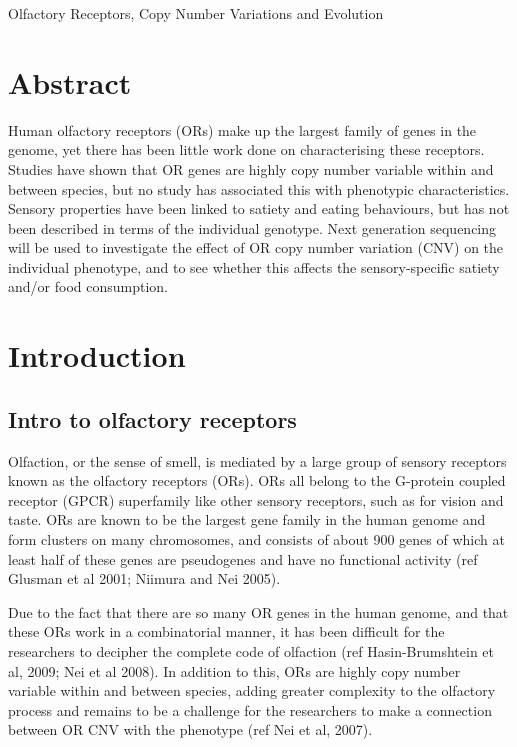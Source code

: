 \documentclass[a4paper, 12pt]{article}
\begin{document}
\begin{center}
\large{Olfactory Receptors, Copy Number Variations and Evolution}
\end{center}

\section*{\normalsize{Abstract}}

Human olfactory receptors (ORs) make up the largest family of genes in the genome, yet there has been little work done on characterising these receptors.
Studies have shown that OR genes are highly copy number variable within and between species, but no study has associated this with phenotypic characteristics.
Sensory properties have been linked to satiety and eating behaviours, but has not been described in terms of the individual genotype.
Next generation sequencing will be used to investigate the effect of OR copy number variation (CNV) on the individual phenotype, and to see whether this affects the sensory-specific satiety and/or food consumption.

\section*{Introduction}

\subsection*{Intro to olfactory receptors}

Olfaction, or the sense of smell, is mediated by a large group of sensory receptors known as the olfactory receptors (ORs).
ORs all belong to the G-protein coupled receptor (GPCR) superfamily like other sensory receptors, such as for vision and taste.
ORs are known to be the largest gene family in the human genome and form clusters on many chromosomes, and consists of about 900 genes of which at least half of these genes are pseudogenes and have no functional activity (ref Glusman et al 2001; Niimura and Nei 2005).

Due to the fact that there are so many OR genes in the human genome, and that these ORs work in a combinatorial manner, it has been difficult for the researchers to decipher the complete code of olfaction (ref Hasin-Brumshtein et al, 2009; Nei et al 2008).
In addition to this, ORs are highly copy number variable within and between species, adding greater complexity to the olfactory process and remains to be a challenge for the researchers to make a connection between OR CNV with the phenotype (ref Nei et al, 2007).
\end{document}

